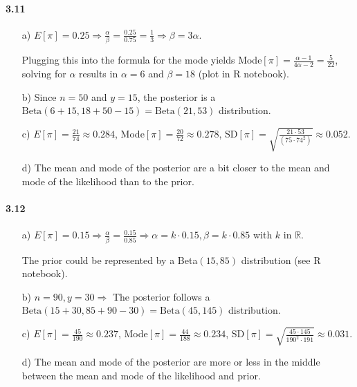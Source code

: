 \documentclass[fontsize=11pt,DIV=18,parskip=half]{scrartcl}
\begin{document}
\paragraph{3.11}
\begin{enumerate}
\item[a)] $E[\pi] = 0.25 \Rightarrow \frac{\alpha}{\beta} = \frac{0.25}{0.75} = \frac13 \Rightarrow \beta=3\alpha$.

Plugging this into the formula for the mode yields Mode$[\pi] = \frac{\alpha-1}{4\alpha-2} = \frac{5}{22}$, solving for $\alpha$ results in $\alpha=6$ and $\beta=18$ (plot in R notebook).

\item[b)] Since $n=50$ and $y=15$, the posterior is a $\text{Beta}(6+15, 18+50-15)=\text{Beta}(21, 53)$ distribution.

\item[c)] $E[\pi] = \frac{21}{74} \approx 0.284$, Mode$[\pi] = \frac{20}{72} \approx 0.278$, SD$[\pi] = \sqrt{\frac{21 \cdot 53}{(75 \cdot 74^2)}} \approx 0.052$.

\item[d)] The mean and mode of the posterior are a bit closer to the mean and mode of the likelihood than to the prior.
\end{enumerate}


\paragraph{3.12}
\begin{enumerate}
\item[a)] $E[\pi] = 0.15 \Rightarrow \frac{\alpha}{\beta} = \frac{0.15}{0.85}  \Rightarrow \alpha=k\cdot0.15, \beta=k\cdot0.85$ with $k$ in $\mathbb{R}$.

The prior could be represented by a Beta$(15,85)$ distribution (see R notebook).

\item[b)] $n=90, y=30 \Rightarrow$ The posterior follows a $\text{Beta}(15 + 30, 85 + 90 - 30)=\text{Beta}(45, 145)$ distribution.

\item[c)] $E[\pi] = \frac{45}{190} \approx 0.237$, Mode$[\pi] = \frac{44}{188} \approx 0.234$, SD$[\pi] = \sqrt{\frac{45\cdot145}{190^2\cdot191}} \approx 0.031$.

\item[d)] The mean and mode of the posterior are more or less in the middle between the mean and mode of the likelihood and prior.
\end{enumerate}
\end{document}
